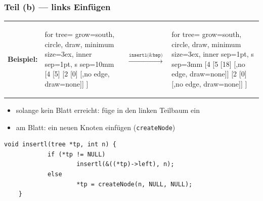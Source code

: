 \documentclass{beamer}
\begin{document}
\begin{frame}[fragile] \frametitle{Teil (b) --- links Einfügen}
	\begin{tabularx}{\linewidth}{m{2cm} m{2cm} m{1.5cm} m{3cm}}
		\textbf{Beispiel:}
		&
		\begin{forest}
			for tree={ grow=south, circle, draw, minimum size=3ex, inner sep=1pt, s sep=10mm }
			[4 	[5] [2 [0] [,no edge, draw=none]] ]
		\end{forest}
		&
		$\overset{\texttt{insertl(\&bsp)}}{\longrightarrow}$
		&
		\begin{forest}
			for tree={ grow=south, circle, draw, minimum size=3ex, inner sep=1pt, s sep=3mm }
			[4 	[5 [18] [,no edge, draw=none]] [2 [0] [,no edge, draw=none]] ]
		\end{forest}
	\end{tabularx}
	\pause
	\begin{itemize}
		\item solange kein Blatt erreicht: füge in den linken Teilbaum ein
		\item am Blatt: ein neuen Knoten einfügen (\texttt{createNode})
	\end{itemize}
	\pause
	\begin{lstlisting}[style=notebook]
	void insertl(tree *tp, int n) {
			if (*tp != NULL)
					insertl(&((*tp)->left), n);
			else
					*tp = createNode(n, NULL, NULL);
	}
	\end{lstlisting}
\end{frame}
\end{document}

